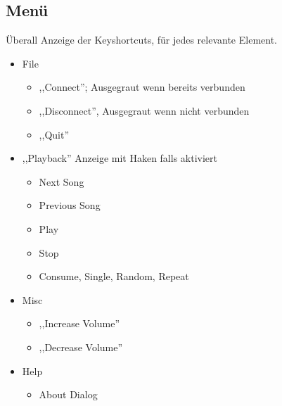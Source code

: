 \subsection{Menü}
Überall Anzeige der Keyshortcuts, für jedes relevante Element.
\begin{itemize}
\item File
  \begin{itemize}
  \item ,,Connect''; Ausgegraut wenn bereits verbunden
  \item ,,Disconnect'', Ausgegraut wenn nicht verbunden
  \item ,,Quit''
  \end{itemize} 
\item ,,Playback'' Anzeige mit Haken falls aktiviert 
  \begin{itemize}
  \item Next Song
  \item Previous Song
  \item Play
  \item Stop
  \item Consume, Single, Random, Repeat 
  \end{itemize}   
\item Misc
  \begin{itemize}
  \item ,,Increase Volume''
  \item ,,Decrease Volume''
  \end{itemize}
\item Help
  \begin{itemize}
  \item About Dialog
  \end{itemize}
\end{itemize}


